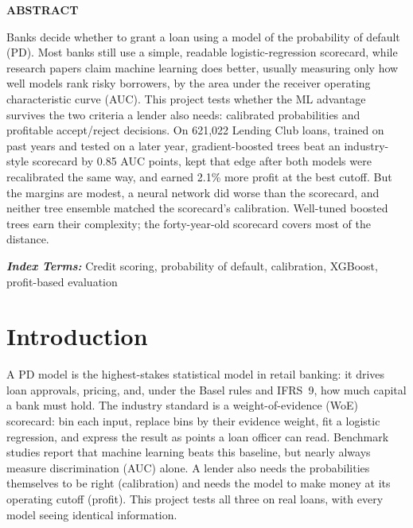\documentclass[a4paper,twocolumn,10pt]{article}
\begin{document}

\begin{center}\textbf{ABSTRACT}\end{center}
\noindent
Banks decide whether to grant a loan using a model of the probability of default (PD). Most banks still use a simple, readable logistic-regression scorecard, while research papers claim machine learning does better, usually measuring only how well models rank risky borrowers, by the area under the receiver operating characteristic curve (AUC). This project tests whether the ML advantage survives the two criteria a lender also needs: calibrated probabilities and profitable accept/reject decisions. On 621{,}022 Lending Club loans, trained on past years and tested on a later year, gradient-boosted trees beat an industry-style scorecard by 0.85 AUC points, kept that edge after both models were recalibrated the same way, and earned 2.1\% more profit at the best cutoff. But the margins are modest, a neural network did worse than the scorecard, and neither tree ensemble matched the scorecard's calibration. Well-tuned boosted trees earn their complexity; the forty-year-old scorecard covers most of the distance.

\vspace{2mm}
\noindent\textbf{\textit{Index Terms:}} Credit scoring, probability of default, calibration, XGBoost, profit-based evaluation

\section{Introduction}
A PD model is the highest-stakes statistical model in retail banking: it drives loan approvals, pricing, and, under the Basel rules and IFRS~9, how much capital a bank must hold. The industry standard is a weight-of-evidence (WoE) scorecard: bin each input, replace bins by their evidence weight, fit a logistic regression, and express the result as points a loan officer can read. Benchmark studies report that machine learning beats this baseline, but nearly always measure discrimination (AUC) alone. A lender also needs the probabilities themselves to be right (calibration) and needs the model to make money at its operating cutoff (profit). This project tests all three on real loans, with every model seeing identical information.
\end{document}
